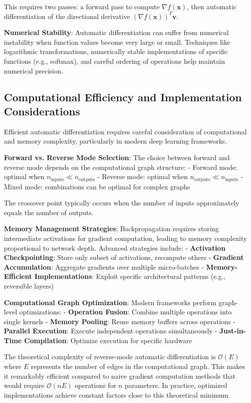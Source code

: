 \documentclass[11pt,a4paper]{report}
\begin{document}
This requires two passes: a forward pass to compute $\nabla f(\mathbf{x})$, then automatic differentiation of the directional derivative $(\nabla f(\mathbf{x}))^T \mathbf{v}$.

\textbf{Numerical Stability}: Automatic differentiation can suffer from numerical instability when function values become very large or small. Techniques like logarithmic transformations, numerically stable implementations of specific functions (e.g., softmax), and careful ordering of operations help maintain numerical precision.

\subsection{Computational Efficiency and Implementation Considerations}

Efficient automatic differentiation requires careful consideration of computational and memory complexity, particularly in modern deep learning frameworks.

\textbf{Forward vs. Reverse Mode Selection}: The choice between forward and reverse mode depends on the computational graph structure:
- Forward mode: optimal when $n_{\text{inputs}} \ll n_{\text{outputs}}$
- Reverse mode: optimal when $n_{\text{outputs}} \ll n_{\text{inputs}}$  
- Mixed mode: combinations can be optimal for complex graphs

The crossover point typically occurs when the number of inputs approximately equals the number of outputs.

\textbf{Memory Management Strategies}: Backpropagation requires storing intermediate activations for gradient computation, leading to memory complexity proportional to network depth. Advanced strategies include:
- \textbf{Activation Checkpointing}: Store only subset of activations, recompute others
- \textbf{Gradient Accumulation}: Aggregate gradients over multiple micro-batches
- \textbf{Memory-Efficient Implementations}: Exploit specific architectural patterns (e.g., reversible layers)

\textbf{Computational Graph Optimization}: Modern frameworks perform graph-level optimizations:
- \textbf{Operation Fusion}: Combine multiple operations into single kernels
- \textbf{Memory Pooling}: Reuse memory buffers across operations  
- \textbf{Parallel Execution}: Execute independent operations simultaneously
- \textbf{Just-in-Time Compilation}: Optimize execution for specific hardware

The theoretical complexity of reverse-mode automatic differentiation is $\mathcal{O}(E)$ where $E$ represents the number of edges in the computational graph. This makes it remarkably efficient compared to naive gradient computation methods that would require $\mathcal{O}(nE)$ operations for $n$ parameters. In practice, optimized implementations achieve constant factors close to this theoretical minimum.
\end{document}
